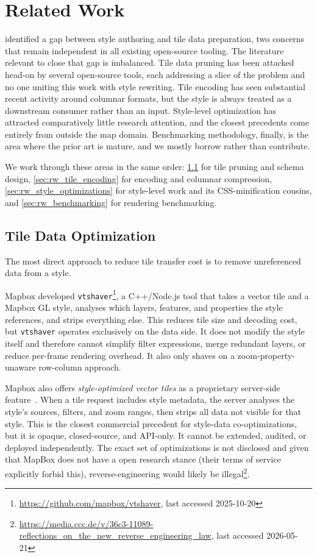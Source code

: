 \chapter{Related Work}\label{ch:related_work}

 identified a gap between style authoring and tile data preparation, two concerns that remain independent in all existing open-source tooling.
The literature relevant to close that gap is imbalanced.
Tile data pruning has been attacked head-on by several open-source tools, each addressing a slice of the problem and no one uniting this work with style rewriting.
Tile encoding has seen substantial recent activity around columnar formats, but the style is always treated as a downstream consumer rather than an input.
Style-level optimization has attracted comparatively little research attention, and the closest precedents come entirely from outside the map domain.
Benchmarking methodology, finally, is the area where the prior art is mature, and we mostly borrow rather than contribute.

We work through these areas in the same order:
\cref{sec:rw_tile_data} for tile pruning and schema design,
\cref{sec:rw_tile_encoding} for encoding and columnar compression,
\cref{sec:rw_style_optimizations} for style-level work and its \ac{CSS}-minification cousins,
and \cref{sec:rw_benchmarking} for rendering benchmarking.

\section{Tile Data Optimization}\label{sec:rw_tile_data}

The most direct approach to reduce tile transfer cost is to remove unreferenced data from a style.

Mapbox developed \texttt{vtshaver}\footnote{\url{https://github.com/mapbox/vtshaver}, last accessed 2025-10-20}, a C++/Node.js tool that takes a vector tile and a Mapbox GL style, analyses which layers, features, and properties the style references, and strips everything else.
This reduces tile size and decoding cost, but \texttt{vtshaver} operates exclusively on the data side.
It does not modify the style itself and therefore cannot simplify filter expressions, merge redundant layers, or reduce per-frame rendering overhead.
It also only shaves on a zoom-property-unaware row-column approach.

Mapbox also offers \emph{style-optimized vector tiles} as a proprietary server-side feature~\cite{StyleoptimizedVectorTiles}.
When a tile request includes style metadata, the server analyses the style's sources, filters, and zoom ranges, then strips all data not visible for that style.
This is the closest commercial precedent for style-data co-optimizations, but it is opaque, closed-source, and \ac{API}-only.
It cannot be extended, audited, or deployed independently.
The exact set of optimizations is not disclosed and given that MapBox does not have a open research stance (their terms of service explicitly forbid this), reverse-engineering would likely be illegal\footnote{\url{https://media.ccc.de/v/36c3-11089-reflections_on_the_new_reverse_engineering_law}, last accessed 2026-05-21}.

